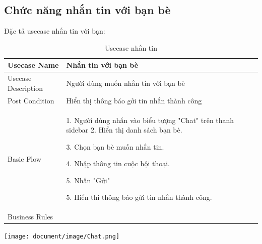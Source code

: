 \subsection{Chức năng nhắn tin với bạn bè}
Đặc tả usecase nhắn tin với bạn: 
\begin{table}[H]
    \centering
	\begin{tabular}{|p{5cm}|p{10cm}|}
    
    \hline
    Usecase Name&Nhắn tin với bạn bè\\
    \hline
    Usecase Description&Người dùng muốn nhắn tin với bạn bè\\
    \hline
    Post Condition&Hiển thị thông báo gởi tin nhắn thành công \\
    \hline
    Basic Flow& 1. Người dùng nhấn vào biểu tượng "Chat" trên thanh sidebar
    2. Hiển thị danh sách bạn bè.
    
    3. Chọn bạn bè muốn nhắn tin.
    
    4. Nhập thông tin cuộc hội thoại.
    
    5. Nhấn "Gửi"
    
    5. Hiển thi thông báo gửi tin nhắn thành công.\\
    

    \hline Business Rules& \\
   
   
	\hline
\end{tabular}
\caption{Usecase nhắn tin}
\end{table}
 \begin{center}
  \captionsetup{type=figure}
  \texttt{[image: document/image/Chat.png]}
\end{center}

